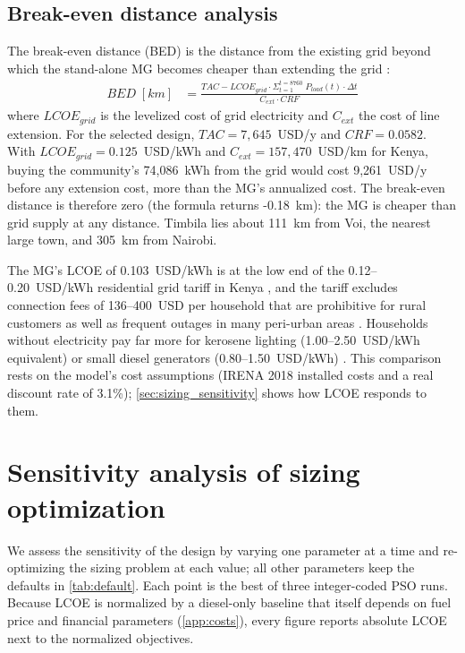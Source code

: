 \documentclass[final,3p,times]{elsarticle}
\begin{document}
\subsection{Break-even distance analysis}

The break-even distance (BED) is the distance from the existing grid beyond which the stand-alone MG becomes cheaper than extending the grid \cite{kaabeche2011a}:
\begin{align*}
    BED \; [km] & = \frac{TAC - LCOE_{grid} \cdot \Sigma_{t=1}^{t=8760}\; P_{load}(t)\cdot \Delta t}{C_{ext} \cdot CRF}
\end{align*}
where $LCOE_{grid}$ is the levelized cost of grid electricity and $C_{ext}$ the cost of line extension. For the selected design, $TAC = 7,645$~USD/y and $CRF = 0.0582$. With $LCOE_{grid} = 0.125$~USD/kWh \cite{LCOEgrid} and $C_{ext} = 157,470$~USD/km \cite{Cext} for Kenya, buying the community's 74,086~kWh from the grid would cost 9,261~USD/y before any extension cost, more than the MG's annualized cost. The break-even distance is therefore zero (the formula returns -0.18~km): the MG is cheaper than grid supply at any distance. Timbila lies about 111~km from Voi, the nearest large town, and 305~km from Nairobi.

The MG's LCOE of 0.103~USD/kWh is at the low end of the 0.12--0.20~USD/kWh residential grid tariff in Kenya \cite{LCOEgrid}, and the tariff excludes connection fees of 136--400~USD per household that are prohibitive for rural customers \cite{quak_CBA, golumbeanu2013} as well as frequent outages in many peri-urban areas \cite{iea_africa2019}. Households without electricity pay far more for kerosene lighting (1.00--2.50~USD/kWh equivalent) \cite{tracy2012} or small diesel generators (0.80--1.50~USD/kWh) \cite{quak_CBA}. This comparison rests on the model's cost assumptions (IRENA 2018 installed costs and a real discount rate of 3.1\%); \cref{sec:sizing_sensitivity} shows how LCOE responds to them.

\section{Sensitivity analysis of sizing optimization\label{sec:sizing_sensitivity}}

We assess the sensitivity of the design by varying one parameter at a time and re-optimizing the sizing problem at each value; all other parameters keep the defaults in \cref{tab:default}. Each point is the best of three integer-coded PSO runs. Because LCOE is normalized by a diesel-only baseline that itself depends on fuel price and financial parameters (\cref{app:costs}), every figure reports absolute LCOE next to the normalized objectives.
\end{document}
